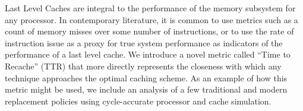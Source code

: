 Last Level Caches are integral to the performance of the memory
subsystem for any processor.
In contemporary literature, it is common to use metrics such as a
count of memory misses over some number of instructions, or to use the
rate of instruction issue as a proxy for true system performance as
indicators of the performance of a last level cache.
We introduce a novel metric called ``Time to Recache'' (TTR) that more
directly represents the closeness with which any technique approaches
the optimal caching scheme.
As an example of how this metric might be used, we include an analysis
of a few traditional and modern replacement policies using
cycle-accurate processor and cache simulation.
